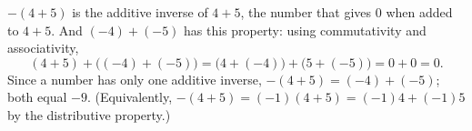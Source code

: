 $-(4+5)$ is the additive inverse of $4+5$, the number that gives $0$ when added to $4+5$. And $(-4)+(-5)$ has this property: using commutativity and associativity,
\[
(4+5)+\bigl((-4)+(-5)\bigr)=\bigl(4+(-4)\bigr)+\bigl(5+(-5)\bigr)=0+0=0 .
\]
Since a number has only one additive inverse, $-(4+5)=(-4)+(-5)$; both equal $-9$. (Equivalently, $-(4+5)=(-1)(4+5)=(-1)4+(-1)5$ by the distributive property.)
